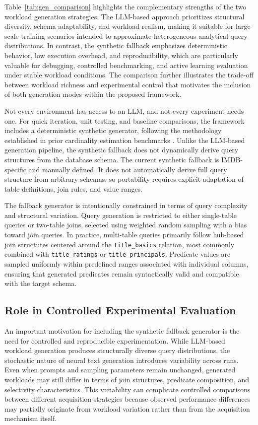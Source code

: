Table~\ref{tab:gen_comparison} highlights the complementary strengths of the two workload generation strategies. The LLM-based approach prioritizes structural diversity, schema adaptability, and workload realism, making it suitable for large-scale training scenarios intended to approximate heterogeneous analytical query distributions. In contrast, the synthetic fallback emphasizes deterministic behavior, low execution overhead, and reproducibility, which are particularly valuable for debugging, controlled benchmarking, and active learning evaluation under stable workload conditions. The comparison further illustrates the trade-off between workload richness and experimental control that motivates the inclusion of both generation modes within the proposed framework.

Not every environment has access to an LLM, and not every experiment needs one. For quick iteration, unit testing, and baseline comparisons, the framework includes a deterministic synthetic generator, following the methodology established in prior cardinality estimation benchmarks \cite{DBLP:conf/cidr/KipfKRLBK19} \cite{leis2015how}. Unlike the LLM-based generation pipeline, the synthetic fallback does not dynamically derive query structures from the database schema. The current synthetic fallback is IMDB-specific and manually defined. It does not automatically derive full query structure from arbitrary schemas, so portability requires explicit adaptation of table definitions, join rules, and value ranges.

The fallback generator is intentionally constrained in terms of query complexity and structural variation. Query generation is restricted to either single-table queries or two-table joins, selected using weighted random sampling with a bias toward join queries. In practice, multi-table queries primarily follow hub-based join structures centered around the \texttt{title\_basics} relation, most commonly combined with \texttt{title\_ratings} or \texttt{title\_principals}. Predicate values are sampled uniformly within predefined ranges associated with individual columns, ensuring that generated predicates remain syntactically valid and compatible with the target schema.

\subsection{Role in Controlled Experimental Evaluation}

An important motivation for including the synthetic fallback generator is the need for controlled and reproducible experimentation. While LLM-based workload generation produces structurally diverse query distributions, the stochastic nature of neural text generation introduces variability across runs. Even when prompts and sampling parameters remain unchanged, generated workloads may still differ in terms of join structures, predicate composition, and selectivity characteristics. This variability can complicate controlled comparisons between different acquisition strategies because observed performance differences may partially originate from workload variation rather than from the acquisition mechanism itself.


